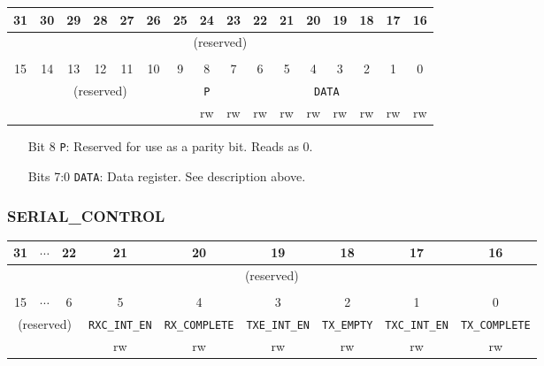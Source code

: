\documentclass[11pt,openany]{report}
\begin{document}
\centering
\begin{tabular}{|c|c|c|c|c|c|c|c|c|c|c|c|c|c|c|c|}
  \hline
  31 & 30 & 29 & 28 & 27 & 26 & 25 & 24 & 23 & 22 & 21 & 20 & 19 & 18 & 17 & 16 \\
  \hline
  \multicolumn{16}{|c|}{\multirow{2}{*}{(reserved)}}\\
  \multicolumn{16}{|c|}{}\\
  \hline
  \multicolumn{16}{c}{}\\
  \hline
  15 & 14 & 13 & 12 & 11 & 10 & 9 & 8 & 7 & 6 & 5 & 4 & 3 & 2 & 1 & 0 \\
  \hline
  \multicolumn{7}{|c|}{\multirow{2}{*}{(reserved)}} & \texttt{P} & \multicolumn{8}{c|}{\texttt{DATA}}\\
  \cline{8-16}
  \multicolumn{7}{|c|}{} & rw & rw & rw & rw & rw & rw & rw & rw & rw\\
  \hline
\end{tabular}

\begin{enumerate}
\item[Bit 8] \verb|P|: Reserved for use as a parity bit. Reads as 0.
\item[Bits 7:0] \verb|DATA|: Data register. See description above.
\end{enumerate}

\subsubsection{SERIAL\_CONTROL}
\centering
\begin{tabular}{|c|c|c|c|c|c|c|c|c|}
  \hline
  31 & $\cdots$ & 22 & 21 & 20 & 19 & 18 & 17 & 16 \\
  \hline
  \multicolumn{9}{|c|}{\multirow{2}{*}{(reserved)}}\\
  \multicolumn{9}{|c|}{}\\
  \hline
  \multicolumn{9}{c}{}\\
  \hline
  15 & $\cdots$ & 6 & 5 & 4 & 3 & 2 & 1 & 0 \\
  \hline
  \multicolumn{3}{|c|}{\multirow{2}{*}{(reserved)}} & \texttt{RXC\_INT\_EN} & \texttt{RX\_COMPLETE} & \texttt{TXE\_INT\_EN} & \texttt{TX\_EMPTY} & \texttt{TXC\_INT\_EN} & \texttt{TX\_COMPLETE} \\
  \cline{4-9}
  \multicolumn{3}{|c|}{} & rw & rw & rw & rw & rw & rw\\
  \hline
\end{tabular}
\end{document}
